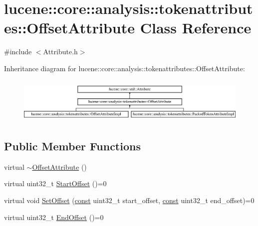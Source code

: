 \hypertarget{classlucene_1_1core_1_1analysis_1_1tokenattributes_1_1OffsetAttribute}{}\section{lucene\+:\+:core\+:\+:analysis\+:\+:tokenattributes\+:\+:Offset\+Attribute Class Reference}
\label{classlucene_1_1core_1_1analysis_1_1tokenattributes_1_1OffsetAttribute}


{\ttfamily \#include $<$Attribute.\+h$>$}

Inheritance diagram for lucene\+:\+:core\+:\+:analysis\+:\+:tokenattributes\+:\+:Offset\+Attribute\+:\begin{figure}[H]
\begin{center}
\leavevmode
\includegraphics[height=2.210526cm]{classlucene_1_1core_1_1analysis_1_1tokenattributes_1_1OffsetAttribute}
\end{center}
\end{figure}
\subsection*{Public Member Functions}
\begin{DoxyCompactItemize}
\item 
virtual \mbox{\hyperlink{classlucene_1_1core_1_1analysis_1_1tokenattributes_1_1OffsetAttribute_aae91ff2e429a7f882d00b64a01b1f326}{$\sim$\+Offset\+Attribute}} ()
\item 
virtual uint32\+\_\+t \mbox{\hyperlink{classlucene_1_1core_1_1analysis_1_1tokenattributes_1_1OffsetAttribute_af841d190a7900a5b6a00f0a9f4ae7e43}{Start\+Offset}} ()=0
\item 
virtual void \mbox{\hyperlink{classlucene_1_1core_1_1analysis_1_1tokenattributes_1_1OffsetAttribute_aa0d076ac2e7c5af86668fbbeb8e26170}{Set\+Offset}} (\mbox{\hyperlink{ZlibCrc32_8h_a2c212835823e3c54a8ab6d95c652660e}{const}} uint32\+\_\+t start\+\_\+offset, \mbox{\hyperlink{ZlibCrc32_8h_a2c212835823e3c54a8ab6d95c652660e}{const}} uint32\+\_\+t end\+\_\+offset)=0
\item 
virtual uint32\+\_\+t \mbox{\hyperlink{classlucene_1_1core_1_1analysis_1_1tokenattributes_1_1OffsetAttribute_ada281ff6240e1a0fecf57707329ec974}{End\+Offset}} ()=0
\end{DoxyCompactItemize}
